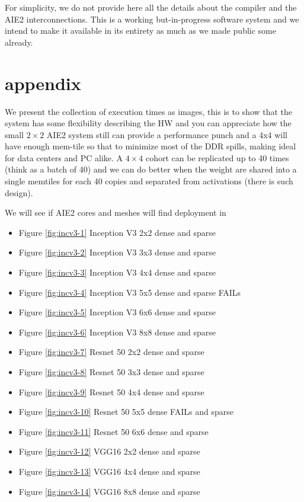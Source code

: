 \documentclass[conference]{IEEEtran}
\begin{document}
For simplicity, we do not provide here all the details about the
compiler and the AIE2 interconnections. This is a working
but-in-progress software system and we intend to make it available in
its entirety as much as we made public some already.
     
     
\section{appendix}
We present the collection of execution times as images, this is to
show that the system has some flexibility describing the HW and you
can appreciate how the small $2\times 2$ AIE2 system still can provide
a performance punch and a 4x4 will have enough mem-tile so that to
minimize most of the DDR spills, making ideal for data centers and PC
alike. A $4\times 4$ cohort can be replicated up to 40 times (think as
a batch of 40) and we can do better when the weight are shared into a
single memtiles for each 40 copies and separated from activations
(there is such design).

We will see if AIE2 cores and meshes will find deployment in
\begin{itemize}
  \item Figure \ref{fig:incv3-1} Inception V3 2x2 dense and sparse
  \item Figure \ref{fig:incv3-2} Inception V3 3x3 dense and sparse
  \item Figure \ref{fig:incv3-3} Inception V3 4x4 dense and sparse
  \item Figure \ref{fig:incv3-4} Inception V3 5x5 dense and sparse FAILs
  \item Figure \ref{fig:incv3-5} Inception V3 6x6 dense and sparse 
  \item Figure \ref{fig:incv3-6} Inception V3 8x8 dense and sparse
  \item Figure \ref{fig:incv3-7} Resnet 50 2x2 dense and sparse   
  \item Figure \ref{fig:incv3-8} Resnet 50 3x3 dense and sparse   
  \item Figure \ref{fig:incv3-9} Resnet 50 4x4 dense and sparse   
  \item Figure \ref{fig:incv3-10} Resnet 50 5x5 dense FAILs and sparse   
  \item Figure \ref{fig:incv3-11} Resnet 50 6x6 dense and sparse   
  \item Figure \ref{fig:incv3-12} VGG16  2x2 dense and sparse   
  \item Figure \ref{fig:incv3-13} VGG16  4x4 dense and sparse   
  \item Figure \ref{fig:incv3-14} VGG16  8x8 dense and sparse   
\end{itemize}
\end{document}
